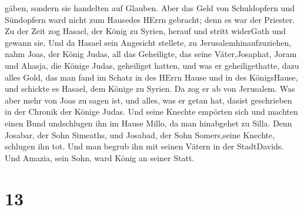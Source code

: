 gäben, sondern sie handelten auf Glauben.  Aber das Geld
von Schuldopfern und Sündopfern ward nicht zum Hausedes HErrn gebracht;
denn es war der Priester.  Zu der Zeit zog Hasael, der
König zu Syrien, herauf und stritt widerGath und gewann sie. Und da
Hasael sein Angesicht stellete, zu Jerusalemhinaufzuziehen,
 nahm Joas, der König Judas, all das Geheiligte, das seine
Väter,Josaphat, Joram und Ahasja, die Könige Judas, geheiliget hatten,
und was er geheiligethatte, dazu alles Gold, das man fand im Schatz in
des HErrn Hause und in des KönigsHause, und schickte es Hasael, dem
Könige zu Syrien. Da zog er ab von Jerusalem.  Was aber
mehr von Joas zu sagen ist, und alles, was er getan hat, dasist
geschrieben in der Chronik der Könige Judas.  Und seine
Knechte empörten sich und machten einen Bund undschlugen ihn im Hause
Millo, da man hinabgehet zu Silla.  Denn Josabar, der Sohn
Simeaths, und Josabad, der Sohn Somers,seine Knechte, schlugen ihn tot.
Und man begrub ihn mit seinen Vätern in der StadtDavids. Und Amazia,
sein Sohn, ward König an seiner Statt.

\hypertarget{section-12}{%
\section{13}\label{section-12}}


